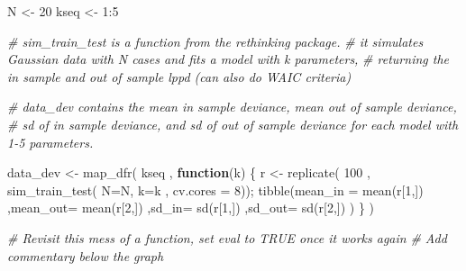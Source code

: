 \documentclass[
]{book}
\newenvironment{Shaded}{\begin{snugshade}}{\end{snugshade}}
\newcommand{\AttributeTok}[1]{\textcolor[rgb]{0.77,0.63,0.00}{#1}}
\newcommand{\CommentTok}[1]{\textcolor[rgb]{0.56,0.35,0.01}{\textit{#1}}}
\newcommand{\ControlFlowTok}[1]{\textcolor[rgb]{0.13,0.29,0.53}{\textbf{#1}}}
\newcommand{\DecValTok}[1]{\textcolor[rgb]{0.00,0.00,0.81}{#1}}
\newcommand{\FunctionTok}[1]{\textcolor[rgb]{0.00,0.00,0.00}{#1}}
\newcommand{\NormalTok}[1]{#1}
\newcommand{\OtherTok}[1]{\textcolor[rgb]{0.56,0.35,0.01}{#1}}
\newcommand{\SpecialCharTok}[1]{\textcolor[rgb]{0.00,0.00,0.00}{#1}}
\begin{document}
\begin{Shaded}
\begin{Highlighting}[]
\NormalTok{N }\OtherTok{\textless{}{-}} \DecValTok{20} 
\NormalTok{kseq }\OtherTok{\textless{}{-}} \DecValTok{1}\SpecialCharTok{:}\DecValTok{5} 

\CommentTok{\# sim\_train\_test is a function from the rethinking package.}
\CommentTok{\# it simulates Gaussian data with N cases and fits a model with k parameters, }
\CommentTok{\# returning the in sample and out of sample lppd (can also do WAIC criteria)}

\CommentTok{\# data\_dev contains the mean in sample deviance, mean out of sample deviance, }
\CommentTok{\# sd of in sample deviance, and sd of out of sample deviance for each model with 1{-}5 parameters.  }

\NormalTok{data\_dev }\OtherTok{\textless{}{-}} \FunctionTok{map\_dfr}\NormalTok{( kseq , }\ControlFlowTok{function}\NormalTok{(k) \{}
\NormalTok{  r }\OtherTok{\textless{}{-}} \FunctionTok{replicate}\NormalTok{( }\DecValTok{100}\NormalTok{ , }\FunctionTok{sim\_train\_test}\NormalTok{( }\AttributeTok{N=}\NormalTok{N, }\AttributeTok{k=}\NormalTok{k , }\AttributeTok{cv.cores =} \DecValTok{8}\NormalTok{)); }
  \FunctionTok{tibble}\NormalTok{(}\AttributeTok{mean\_in =} \FunctionTok{mean}\NormalTok{(r[}\DecValTok{1}\NormalTok{,]) ,}\AttributeTok{mean\_out=} \FunctionTok{mean}\NormalTok{(r[}\DecValTok{2}\NormalTok{,]) ,}\AttributeTok{sd\_in=} \FunctionTok{sd}\NormalTok{(r[}\DecValTok{1}\NormalTok{,]) ,}\AttributeTok{sd\_out=} \FunctionTok{sd}\NormalTok{(r[}\DecValTok{2}\NormalTok{,]) )}
\NormalTok{\} )}

\CommentTok{\# Revisit this mess of a function, set eval to TRUE once it works again}
\CommentTok{\# Add commentary below the graph}


\end{Highlighting}
\end{Shaded}
\end{document}
